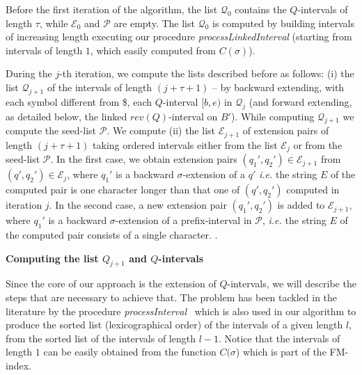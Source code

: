 \documentclass[runningheads,envcountsame,a4paper]{llncs}
\newcommand{\ie}{\textit{i.e.}\xspace}
\begin{document}
Before the first iteration of the algorithm, the list $\mathcal{Q}_0$ contains the
$Q$-intervals of length $\tau$, while  $\mathcal{E}_0$ and $\mathcal{P}$ are empty.
The list $\mathcal{Q}_0$ is computed  by building intervals of increasing length
executing our procedure \emph{processLinkedInterval} (starting from intervals of
length $1$, which easily computed from $C(\sigma)$).



During the $j$-th iteration, we compute the lists described before as follows:
(i) the list $\mathcal{Q}_{j+1}$ of the
intervals of length $(j+\tau+1)$  -- by backward extending, with each symbol different from \$, each $Q$-interval $[b, e)$ in $\mathcal{Q}_{j}$ (and forward extending, as detailed  below, the
linked $rev(Q)$-interval on $B'$). While computing $\mathcal{Q}_{j+1}$ we compute the seed-list $\mathcal{P}$.
We compute
(ii) the list $\mathcal{E}_{j+1}$ of
extension pairs of length $(j+\tau+1)$  taking ordered intervals   either from
the  list   $\mathcal{E}_{j}$ or from the seed-list $\mathcal{P}$.
In the first case,
we obtain  extension pairs $(q_{1}',q_{2}') \in \mathcal{E}_{j+1}$  from $(q',q_{2}')\in \mathcal{E}_{j}$, where
$q_{1}'$ is a backward $\sigma$-extension
of a $q'$   \ie the string $E$ of the computed pair is one
character longer than that one of $(q', q_{2}')$ computed in iteration $j$.
In the second case,
a new  extension pair
$(q_{1}',q_{2}')$ is added to $\mathcal{E}_{j+1}$, where   $q_{1}'$ is a backward $\sigma$-extension
of a prefix-interval in $\mathcal{P}$,  \ie the string $E$ of the computed pair
consists of a single character.
.


\noindent
{\bf  Computing  the list $Q_{j+1} $ and $Q$-intervals}

Since the core of our approach is the extension of $Q$-intervals, we will
describe the steps that are necessary to achieve that.
The problem has been tackled in the literature by
the procedure \emph{processInterval}~\cite{Cox2012} which is also used in our algorithm to produce the sorted list
(lexicographical order) of the intervals of a given length $l$, from the
sorted list of the intervals of length $l-1$. Notice that the intervals of length $1$
can be easily obtained from the  function $C(\sigma$) which is part of the FM-index.
\end{document}
